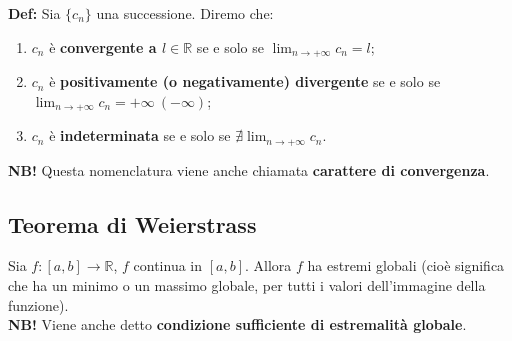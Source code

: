 \documentclass{article}
\begin{document}
\noindent\textbf{Def:} Sia $\{c_n\}$ una successione. Diremo che:
\begin{enumerate}
  \item $c_n$ è \textbf{convergente a $l \in \mathbb{R}$} se e solo se $\lim_{n \to +\infty} c_n = l$;
  \item $c_n$ è \textbf{positivamente (o negativamente) divergente} se e solo se $\lim_{n \to +\infty} c_n = +\infty \ (-\infty)$;
  \item $c_n$ è \textbf{indeterminata} se e solo se $\nexists \lim_{n \to +\infty} c_n$.
\end{enumerate}

\noindent\textbf{NB!} Questa nomenclatura viene anche chiamata \textbf{carattere di convergenza}.

\subsection{Teorema di Weierstrass}
Sia $f: [a, b] \xrightarrow{} \mathbb{R}$, $f$ continua in $[a, b]$. Allora $f$ ha estremi globali (cioè significa che ha un minimo o un massimo globale, per tutti i valori dell'immagine della funzione).\\

\noindent\textbf{NB!} Viene anche detto \textbf{condizione sufficiente di estremalità globale}.
\end{document}
